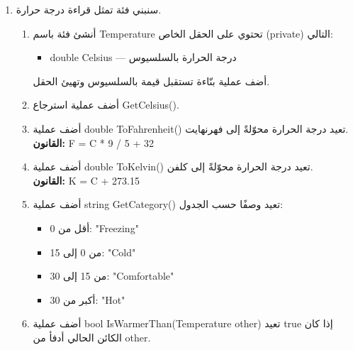 \documentclass[14pt]{extarticle}
\begin{document}
\begin{enumerate}[itemsep=2em]
{\begin{boxSolution}
\begin{english}
\begin{verbatim}
m1.Print();
m2.Print();

m1.SetRating(7.5);
Console.WriteLine("Is m1 highly rated? " + m1.IsHighlyRated());
\end{verbatim}
\end{english}
\end{boxSolution}
}
\fi
\clearpage


\item
سنبني فئة تمثل قراءة درجة حرارة.
\begin{enumerate}[itemsep=1em]
    \item أنشئ فئة باسم \textenglish{Temperature} تحتوي على الحقل الخاص (\textenglish{private}) التالي:
    \begin{itemize}[itemsep=1pt]
        \item \textenglish{double Celsius} — درجة الحرارة بالسلسيوس
    \end{itemize}
    أضف عملية بنّاءة تستقبل قيمة بالسلسيوس وتهيئ الحقل.

    \item أضف عملية استرجاع \textenglish{GetCelsius()}.

    \item أضف عملية \textenglish{double ToFahrenheit()} تعيد درجة الحرارة محوّلةً إلى فهرنهايت.\\
    \textbf{القانون:} \textenglish{F = C * 9 / 5 + 32}

    \item أضف عملية \textenglish{double ToKelvin()} تعيد درجة الحرارة محوّلةً إلى كلفن.\\
    \textbf{القانون:} \textenglish{K = C + 273.15}

    \item أضف عملية \textenglish{string GetCategory()} تعيد وصفًا حسب الجدول:
    \begin{itemize}[itemsep=1pt]
        \item أقل من \textenglish{0}: \textenglish{"Freezing"}
        \item من \textenglish{0} إلى \textenglish{15}: \textenglish{"Cold"}
        \item من \textenglish{15} إلى \textenglish{30}: \textenglish{"Comfortable"}
        \item أكبر من \textenglish{30}: \textenglish{"Hot"}
    \end{itemize}

    \item أضف عملية \textenglish{bool IsWarmerThan(Temperature other)} تعيد \textenglish{true} إذا كان الكائن الحالي أدفأ من \textenglish{other}.


\end{enumerate}
\end{enumerate}
\end{document}

